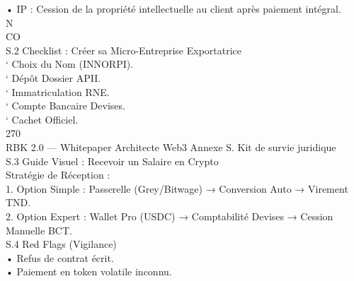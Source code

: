 \documentclass[12pt,landscape,a4paper]{article}
\begin{document}
• IP : Cession de la propriété intellectuelle au client après paiement intégral.\\
\vspace{0.5em}
\vspace{0.5em}
\vspace{0.5em}
N\\
CO\\
S.2 Checklist : Créer sa Micro-Entreprise Exportatrice\\
` Choix du Nom (INNORPI).\\
\vspace{0.5em}
` Dépôt Dossier APII.\\
\vspace{0.5em}
` Immatriculation RNE.\\
\vspace{0.5em}
` Compte Bancaire Devises.\\
\vspace{0.5em}
` Cachet Officiel.\\
\vspace{0.5em}
\vspace{0.5em}
\vspace{0.5em}
\vspace{0.5em}
270\\
RBK 2.0 — Whitepaper Architecte Web3                                                    Annexe S. Kit de survie juridique\\
\vspace{0.5em}
\vspace{0.5em}
\vspace{0.5em}
S.3 Guide Visuel : Recevoir un Salaire en Crypto\\
Stratégie de Réception :\\
\vspace{0.5em}
1. Option Simple : Passerelle (Grey/Bitwage) → Conversion Auto → Virement TND.\\
\vspace{0.5em}
2. Option Expert : Wallet Pro (USDC) → Comptabilité Devises → Cession Manuelle BCT.\\
\vspace{0.5em}
\vspace{0.5em}
\vspace{0.5em}
S.4 Red Flags (Vigilance)\\
• Refus de contrat écrit.\\
\vspace{0.5em}
• Paiement en token volatile inconnu.\\
\vspace{0.5em}
\end{document}
